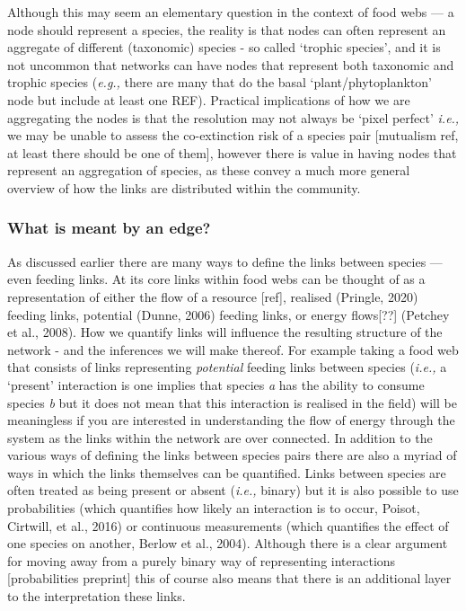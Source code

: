 \documentclass[
]{article}
\begin{document}
Although this may seem an elementary question in the context of food
webs --- a node should represent a species, the reality is that nodes
can often represent an aggregate of different (taxonomic) species - so
called `trophic species', and it is not uncommon that networks can have
nodes that represent both taxonomic and trophic species (\emph{e.g.,}
there are many that do the basal `plant/phytoplankton' node but include
at least one REF). Practical implications of how we are aggregating the
nodes is that the resolution may not always be `pixel perfect'
\emph{i.e.,} we may be unable to assess the co-extinction risk of a
species pair {[}mutualism ref, at least there should be one of them{]},
however there is value in having nodes that represent an aggregation of
species, as these convey a much more general overview of how the links
are distributed within the community.

\subsubsection{What is meant by an
edge?}\label{what-is-meant-by-an-edge}

As discussed earlier there are many ways to define the links between
species --- even feeding links. At its core links within food webs can
be thought of as a representation of either the flow of a resource
{[}ref{]}, realised (Pringle, 2020) feeding links, potential (Dunne,
2006) feeding links, or energy flows{[}??{]} (Petchey et al., 2008). How
we quantify links will influence the resulting structure of the network
- and the inferences we will make thereof. For example taking a food web
that consists of links representing \emph{potential} feeding links
between species (\emph{i.e.,} a `present' interaction is one implies
that species \emph{a} has the ability to consume species \emph{b} but it
does not mean that this interaction is realised in the field) will be
meaningless if you are interested in understanding the flow of energy
through the system as the links within the network are over connected.
In addition to the various ways of defining the links between species
pairs there are also a myriad of ways in which the links themselves can
be quantified. Links between species are often treated as being present
or absent (\emph{i.e.,} binary) but it is also possible to use
probabilities (which quantifies how likely an interaction is to occur,
Poisot, Cirtwill, et al., 2016) or continuous measurements (which
quantifies the effect of one species on another, Berlow et al., 2004).
Although there is a clear argument for moving away from a purely binary
way of representing interactions {[}probabilities preprint{]} this of
course also means that there is an additional layer to the
interpretation these links.
\end{document}
